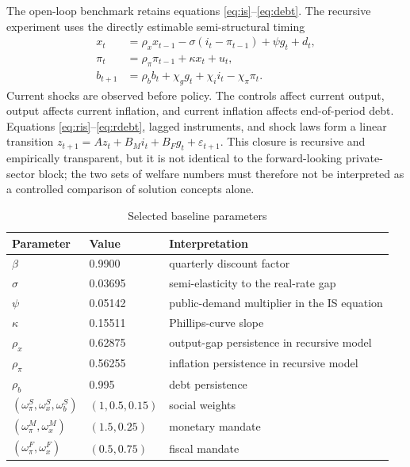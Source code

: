 \documentclass[11pt]{article}
\begin{document}
The open-loop benchmark retains equations \eqref{eq:is}--\eqref{eq:debt}.  The
recursive experiment uses the directly estimable semi-structural timing
\begin{align}
 x_t &= \rho_xx_{t-1}-\sigma(i_t-\pi_{t-1})+\psi g_t+d_t,       \label{eq:ris}\\
 \pi_t &= \rho_\pi\pi_{t-1}+\kappa x_t+u_t,                    \label{eq:rpc}\\
 b_{t+1} &= \rho_bb_t+\chi_gg_t+\chi_ii_t-\chi_\pi\pi_t.       \label{eq:rdebt}
\end{align}
Current shocks are observed before policy.  The controls affect current output,
output affects current inflation, and current inflation affects end-of-period
debt.  Equations \eqref{eq:ris}--\eqref{eq:rdebt}, lagged instruments, and
shock laws form a linear transition $z_{t+1}=Az_t+B_Mi_t+B_Fg_t+\varepsilon_{t+1}$.
This closure is recursive and empirically transparent, but it is not identical
to the forward-looking private-sector block; the two sets of welfare numbers
must therefore not be interpreted as a controlled comparison of solution
concepts alone.

\begin{table}[htbp]
\centering
\caption{Selected baseline parameters}
\label{tab:calibration}
\begin{tabular}{lll}
\toprule
Parameter & Value & Interpretation\\
\midrule
$\beta$ & 0.9900 & quarterly discount factor\\
$\sigma$ & 0.03695 & semi-elasticity to the real-rate gap\\
$\psi$ & 0.05142 & public-demand multiplier in the IS equation\\
$\kappa$ & 0.15511 & Phillips-curve slope\\
$\rho_x$ & 0.62875 & output-gap persistence in recursive model\\
$\rho_\pi$ & 0.56255 & inflation persistence in recursive model\\
$\rho_b$ & 0.995 & debt persistence\\
$(\omega_\pi^S,\omega_x^S,\omega_b^S)$ & $(1,0.5,0.15)$ & social weights\\
$(\omega_\pi^M,\omega_x^M)$ & $(1.5,0.25)$ & monetary mandate\\
$(\omega_\pi^F,\omega_x^F)$ & $(0.5,0.75)$ & fiscal mandate\\
\bottomrule
\end{tabular}
\end{table}
\end{document}
